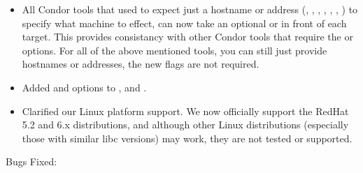 \begin{itemize}
\item All Condor tools that used to expect just a hostname or address 
(, , , ,
, , ) to specify
what machine to effect, can now take an optional  or
 in front of each target.
This provides consistancy with other Condor tools that require the
 or  options.
For all of the above mentioned tools, you can still just provide
hostnames or addresses, the new flags are not required.

\item Added  and  options to ,
 and .

\item Clarified our Linux platform support.  We now officially
support the RedHat 5.2 and 6.x distributions, and although other Linux
distributions (especially those with similar libc versions) may work,
they are not tested or supported.

\end{itemize}

\noindent Bugs Fixed:


